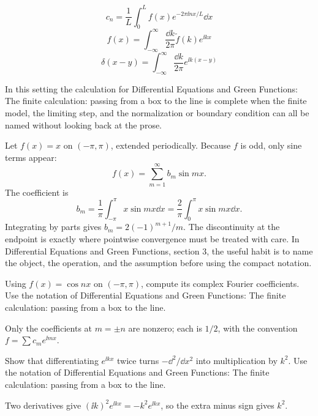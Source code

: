 \[
  c_n=\frac1L\int_0^L f(x)e^{-2\pi\ii nx/L}\dd x
\]
\[
  f(x)=\int_{-\infty}^{\infty}\frac{\dd k}{2\pi}\tilde f(k)e^{\ii kx}
\]
\[
  \delta(x-y)=\int_{-\infty}^{\infty}\frac{\dd k}{2\pi}e^{\ii k(x-y)}
\]

In this setting the calculation for Differential Equations and Green Functions: The finite calculation: passing from a box to the line is complete when the finite model, the limiting step, and the normalization or boundary condition can all be named without looking back at the prose.




\begin{example}
Let \(f(x)=x\) on \((-\pi,\pi)\), extended periodically.  Because \(f\) is odd, only sine terms appear:
\[
  f(x)=\sum_{m=1}^\infty b_m\sin mx.
\]
The coefficient is
\[
  b_m=\frac1\pi\int_{-\pi}^\pi x\sin mx\dd x
  =\frac2\pi\int_0^\pi x\sin mx\dd x.
\]
Integrating by parts gives \(b_m=2(-1)^{m+1}/m\).  The discontinuity at the endpoint is exactly where pointwise convergence must be treated with care.  In Differential Equations and Green Functions, section 3, the useful habit is to name the object, the operation, and the assumption before using the compact notation.
\end{example}



\begin{exercise}
Using \(f(x)=\cos nx\) on \((-\pi,\pi)\), compute its complex Fourier coefficients.  Use the notation of Differential Equations and Green Functions: The finite calculation: passing from a box to the line.
\begin{answer}
Only the coefficients at \(m=\pm n\) are nonzero; each is \(1/2\), with the convention \(f=\sum c_me^{\ii mx}\).
\end{answer}
\end{exercise}

\begin{exercise}
Show that differentiating \(e^{\ii kx}\) twice turns \(-\dd^2/\dd x^2\) into multiplication by \(k^2\).  Use the notation of Differential Equations and Green Functions: The finite calculation: passing from a box to the line.
\begin{answer}
Two derivatives give \((\ii k)^2e^{\ii kx}=-k^2e^{\ii kx}\), so the extra minus sign gives \(k^2\).
\end{answer}
\end{exercise}



